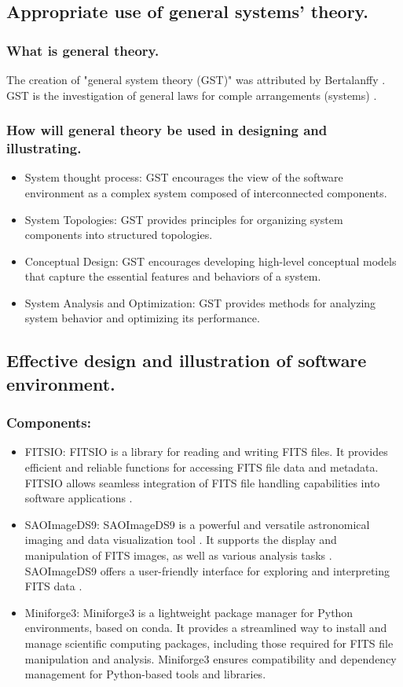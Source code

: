 \documentclass[a4paper,oneside,11pt]{book}
\begin{document}
\subsection{Appropriate use of general systems' theory.}
\subsubsection{What is general theory.}
The creation of "general system theory (GST)" was attributed by Bertalanffy \citep{hofkirchner2011general}. GST is the investigation of general laws for comple arrangements (systems) \citep{sieniutycz2020systems}. 
\subsubsection{How will general theory be used in designing and illustrating.}
\begin{itemize}
    \item System thought process: GST encourages the view of the software environment as a complex system composed of interconnected components.
    \item System Topologies: GST provides principles for organizing system components into structured topologies.
    \item Conceptual Design: GST encourages developing high-level conceptual models that capture the essential features and behaviors of a system. 
    \item System Analysis and Optimization: GST provides methods for analyzing system behavior and optimizing its performance.
\end{itemize}
\subsection{Effective design and illustration of software environment.}
\subsubsection{Components:}
\begin{itemize}
    \item FITSIO:
    FITSIO is a library for reading and writing FITS files. It provides efficient and reliable functions for accessing FITS file data and metadata. FITSIO allows seamless integration of FITS file handling capabilities into software applications \citep{li2005introduction}.
    \item SAOImageDS9: SAOImageDS9 is a powerful and versatile astronomical imaging and data visualization tool \citep{SAOimageDSFeatures}. It supports the display and manipulation of FITS images, as well as various analysis tasks \citep{SAOimageDSFeatures}. SAOImageDS9 offers a user-friendly interface for exploring and interpreting FITS data \citep{SAOimageDSFeatures}.
    \item Miniforge3: Miniforge3 is a lightweight package manager for Python environments, based on conda. It provides a streamlined way to install and manage scientific computing packages, including those required for FITS file manipulation and analysis. Miniforge3 ensures compatibility and dependency management for Python-based tools and libraries.
\end{itemize}
\end{document}
